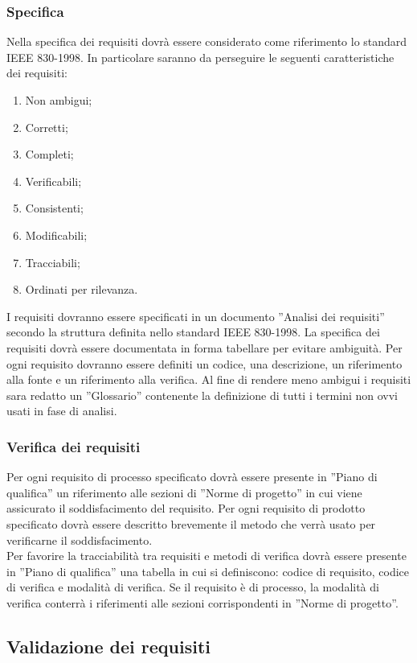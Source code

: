 {{			\subsubsection{Specifica}{
				Nella specifica dei requisiti dovr\`{a} essere considerato come riferimento lo standard IEEE 830-1998. In particolare saranno da perseguire le seguenti caratteristiche dei requisiti:
				\begin{enumerate}
					\item Non ambigui;
					\item Corretti;
					\item Completi;
					\item Verificabili;
					\item Consistenti;
					\item Modificabili;
					\item Tracciabili;
					\item Ordinati per rilevanza.
				\end{enumerate}
				I requisiti dovranno essere specificati in un documento ”Analisi dei requisiti” secondo la struttura definita nello standard IEEE 830-1998. La specifica dei requisiti dovr\`{a} essere documentata in forma tabellare per evitare ambiguit\`{a}. Per ogni requisito dovranno essere definiti un codice, una descrizione, un riferimento alla fonte e un riferimento alla verifica. Al fine di rendere meno ambigui i requisiti sara redatto un ”Glossario” contenente la definizione di tutti i termini non ovvi usati in fase di analisi.
			}
			\subsubsection{Verifica dei requisiti}{
				Per ogni requisito di processo specificato dovr\`{a} essere presente in ”Piano di qualifica” un riferimento alle sezioni di ”Norme di progetto” in cui viene assicurato il soddisfacimento del requisito. Per ogni requisito di prodotto specificato dovr\`{a} essere descritto brevemente il metodo che verr\`{a} usato per verificarne il soddisfacimento.\\Per favorire la tracciabilit\`{a} tra requisiti e metodi di verifica dovr\`{a} essere presente in ”Piano di qualifica” una tabella in cui si definiscono: codice di requisito, codice di verifica e modalit\`{a} di verifica. Se il requisito \`{e} di processo, la modalit\`{a} di verifica conterr\`{a} i riferimenti alle sezioni corrispondenti in ”Norme di progetto”.
			}
		}
		\subsection{Validazione dei requisiti}{
}}
